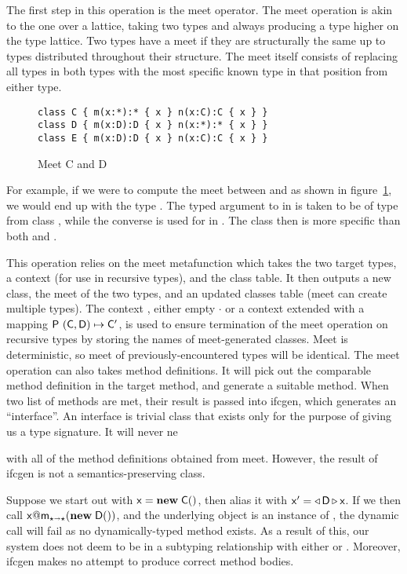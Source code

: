 \documentclass[sigconf]{acmart}
\begin{document}
The first step in this operation is the meet operator. The meet operation is
akin to the one over a lattice, taking two types and always producing a type
higher on the type lattice. Two types have a meet if they are structurally
the same up to \any types distributed throughout their structure. The meet
itself consists of replacing all \any types in both types with the most
specific known type in that position from either type.

\begin{figure}[h]
\begin{lstlisting}
class C { m(x:*):* { x } n(x:C):C { x } }
class D { m(x:D):D { x } n(x:*):* { x } }
class E { m(x:D):D { x } n(x:C):C { x } }
\end{lstlisting}
\caption{Meet C and D}
\label{fig:meetex}
\end{figure}

\noindent
For example, if we were to compute the meet between \C and \D as  shown in
figure~\ref{fig:meetex}, we would end up with the type . The \any typed
argument to \m in \C is taken to be of type \D from class \D, while the
converse is used for \n in \D. The class  then is more specific than
both \C and \D.

This operation relies on the meet metafunction which takes the two target
types, a context (for use in recursive types), and the class table. It then
outputs a new class, the meet of the two types, and an updated classes table
(meet can create multiple types). The context , either empty $\cdot$
or a context extended with a mapping $\P ~{{(\C,\D)}\mapsto\Cp}$, is used to
ensure termination of the meet operation on recursive types by storing the
names of meet-generated classes. Meet is deterministic, so meet of
previously-encountered types will be identical.  The meet operation can also
takes method definitions. It will pick out the comparable method definition
in the target method, and generate a suitable method. When two list of
methods are met, their result is passed into ifcgen, which generates an
``interface''. An interface is trivial class that exists only for the
purpose of giving us a type signature.  It will never ne

 with all of the method definitions obtained from meet. However, the
result of ifcgen is not a semantics-preserving class. 

Suppose we start out with $\x=\New\C{}$, then alias it with
$\xp=\MonCast\D\x$. If we then call $\DynCall\x\m{\New\D{}}$, and the
underlying object is an instance of , the dynamic call will fail as no
dynamically-typed method exists. As a result of this, our system does not
deem  to be in a subtyping relationship with either \C or
\D. Moreover, ifcgen makes no attempt to produce correct method bodies.
\end{document}
